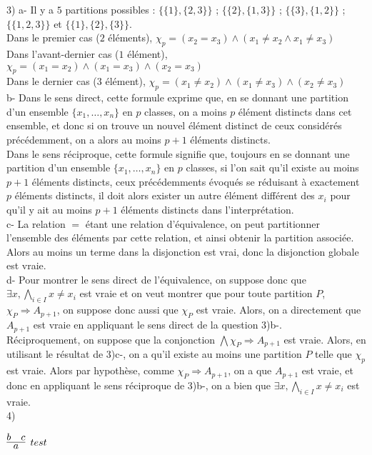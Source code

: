 \documentclass[11pt,a4paper]{article}
\begin{document}
 3) a- Il y a $5$ partitions possibles : $\{\{1\},\{2,3\}\}$ ; $\{\{2\},\{1,3\}\}$ ; $\{\{3\},\{1,2\}\}$ ; $\{\{1,2,3\}\}$ et $\{\{1\},\{2\},\{3\}\}$. \\
Dans le premier cas ($2$ éléments), $\chi_p = (x_2 = x_3)\land (x_1 \neq x_2 \land x_1 \neq x_3)$ \\
Dans l'avant-dernier cas ($1$ élément), $\chi_p = (x_1 = x_2)\land(x_1=x_3)\land(x_2=x_3)$\\
Dans le dernier cas ($3$ élément), $\chi_p = (x_1 \neq x_2)\land(x_1 \neq x_3)\land(x_2 \neq x_3)$\\

b- Dans le sens direct, cette formule exprime que, en se donnant une partition d'un ensemble $\{x_1,\dots,x_n\}$ en $p$ classes, on a moins $p$ élément distincts dans cet ensemble, et donc si on trouve un nouvel élément distinct de ceux considérés précédemment, on a alors au moins $p+1$ éléments distincts. \\
Dans le sens réciproque, cette formule signifie que, toujours en se donnant une partition d'un ensemble $\{x_1,\dots,x_n\}$ en $p$ classes, si l'on sait qu'il existe au moins $p+1$ éléments distincts, ceux précédemments évoqués se réduisant à exactement $p$ éléments distincts, il doit alors exister un autre élément différent des $x_i$ pour qu'il y ait au moins $p+1$ éléments distincts dans l'interprétation.  \\

c- La relation $=$ étant une relation d'équivalence, on peut partitionner l'ensemble des éléments par cette relation, et ainsi obtenir la partition associée. Alors au moins un terme dans la disjonction est vrai, donc la disjonction globale est vraie. \\

d- Pour montrer le sens direct de l'équivalence, on suppose donc que $\exists x, \bigwedge_{i \in I} x \neq x_i$ est vraie et on veut montrer que pour toute partition $P$, $\chi_P \Rightarrow A_{p+1}$, on suppose donc aussi que $\chi_P$ est vraie. Alors, on a directement que $A_{p+1}$ est vraie en appliquant le sens direct de la question 3)b-. \\
Réciproquement, on suppose que la conjonction $\bigwedge \chi_P \Rightarrow A_{p+1}$ est vraie. Alors, en utilisant le résultat de 3)c-, on a qu'il existe au moins une partition $P$ telle que $\chi_p$ est vraie. Alors par hypothèse, comme $\chi_P \Rightarrow A_{p+1}$, on a que $A_{p+1}$ est vraie, et donc en appliquant le sens réciproque de 3)b-, on a bien que $\exists x, \bigwedge_{i \in I} x \neq x_i$ est vraie. \\

4)

$\infer[test]{a}{b & c}$
\end{document}
